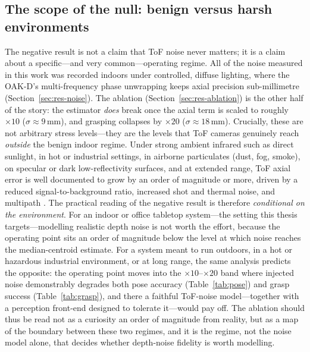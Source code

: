 \subsection{The scope of the null: benign versus harsh environments}
\label{sec:disc-scope}
The negative result is not a claim that ToF noise never matters; it is a claim about a
specific---and very common---operating regime. All of the noise measured in this work was
recorded indoors under controlled, diffuse lighting, where the OAK-D's multi-frequency
phase unwrapping keeps axial precision sub-millimetre (Section~\ref{sec:res-noise}). The
ablation (Section~\ref{sec:res-ablation}) is the other half of the story: the estimator
\emph{does} break once the axial term is scaled to roughly $\times10$ ($\sigma\approx9$\,mm),
and grasping collapses by $\times20$ ($\sigma\approx18$\,mm). Crucially, these are not
arbitrary stress levels---they are the levels that ToF cameras genuinely reach \emph{outside}
the benign indoor regime. Under strong ambient infrared such as direct sunlight, in hot or
industrial settings, in airborne particulates (dust, fog, smoke), on specular or dark
low-reflectivity surfaces, and at extended range, ToF axial error is well documented to grow
by an order of magnitude or more, driven by a reduced signal-to-background ratio, increased
shot and thermal noise, and multipath \cite{foix2011lockin,sarbolandi2015kinect}. The
practical reading of the negative result is therefore \emph{conditional on the environment}.
For an indoor or office tabletop system---the setting this thesis targets---modelling
realistic depth noise is not worth the effort, because the operating point sits an order of
magnitude below the level at which noise reaches the median-centroid estimate. For a system
meant to run outdoors, in a hot or hazardous industrial environment, or at long range, the
same analysis predicts the opposite: the operating point moves into the $\times10$--$\times20$
band where injected noise demonstrably degrades both pose accuracy
(Table~\ref{tab:pose}) and grasp success (Table~\ref{tab:grasp}), and there a faithful
ToF-noise model---together with a perception front-end designed to tolerate it---would pay
off. The ablation should thus be read not as a curiosity an order of magnitude from reality,
but as a map of the boundary between these two regimes, and it is the regime, not the noise
model alone, that decides whether depth-noise fidelity is worth modelling.

